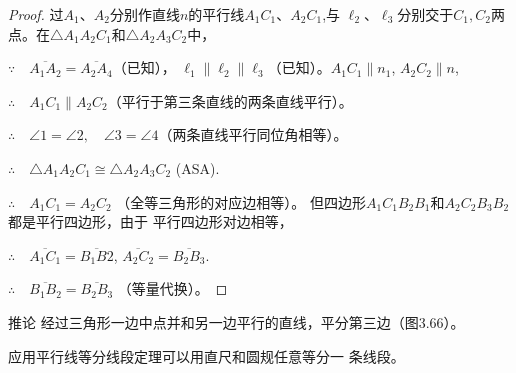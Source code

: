 \begin{proof}
过$A_1$、$A_2$分别作直线$n$的平行线$A_1C_1$、$A_2C_1$,与
$\ell_2$、$\ell_3$分别交于$C_1,C_2$两点。在$\triangle A_1A_2C_1$和$\triangle A_2A_3C_2$中，

$\because\quad \overline{A_1A_2}= \overline{A_2A_4}$（已知），
$\ell_1\parallel \ell_2\parallel \ell_3$（已知）。$A_1C_1\parallel n_1$,  $A_2C_2\parallel n$,

$\therefore\quad A_1C_1\parallel A_2C_2$（平行于第三条直线的两条直线平行）。

$\therefore\quad \angle 1=\angle 2,\quad \angle 3=\angle 4$（两条直线平行同位角相等）。

$\therefore\quad \triangle A_1A_2C_1\cong \triangle A_2A_3C_2$ (ASA).

$\therefore\quad A_1C_1=A_2C_2$ （全等三角形的对应边相等）。
但四边形$A_1C_1B_2B_1$和$A_2C_2B_3B_2$都是平行四边形，由于
平行四边形对边相等，

$\therefore\quad \overline{A_1C_1}=\overline{B_1B2}$, $\overline{A_2C_2}=\overline{B_2B_3}$.

$\therefore\quad \overline{B_1B_2}=\overline{B_2B_3}$ （等量代换）。
\end{proof}    

\begin{blk}
    {推论} 经过三角形一边中点并和另一边平行的直线，平分第三边（图3.66）。
\end{blk}

应用平行线等分线段定理可以用直尺和圆规任意等分一
条线段。

\begin{figure}[htp]\centering
    \begin{minipage}[t]{0.48\textwidth}
    \centering
{}
    \caption{}
    \end{minipage}
    \begin{minipage}[t]{0.48\textwidth}
    \centering
    \caption{}
    \end{minipage}
    \end{figure}

